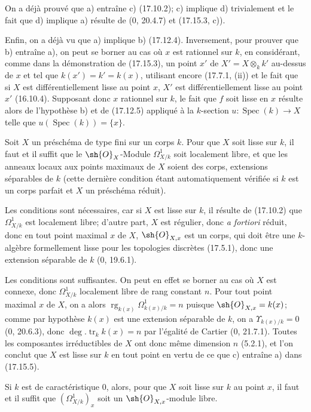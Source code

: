 On a déjà prouvé que a) entraîne c) (17.10.2); c) implique d) trivialement et le fait que d) implique a) résulte de (0, 20.4.7) et (17.15.3, c)).

Enfin, on a déjà vu que a) implique b) (17.12.4). Inversement, pour prouver que b) entraîne a), on peut se borner au cas où $x$ est rationnel sur $k$, en considérant, comme dans la démonstration de (17.15.3), un point $x'$ de $X'=X\otimes_k k'$ au-dessus de $x$ et tel que $k(x')=k'=k(x)$, utilisant encore (17.7.1, (ii)) et le fait que si $X$ est différentiellement lisse au point $x$, $X'$ est différentiellement lisse au point $x'$ (16.10.4). Supposant donc $x$ rationnel sur $k$, le fait que $f$ soit lisse en $x$ résulte alors de l'hypothèse b) et de (17.12.5) appliqué à la $k$-section $u:\operatorname{Spec}(k)\to X$ telle que $u(\operatorname{Spec}(k))=\{x\}$.

\begin{corollary}[17.15.6]
\label{IV.17.15.6}
Soit $X$ un préschéma de type fini sur un corps $k$. Pour que $X$ soit lisse sur $k$, il faut et il suffit que le $\sh{O}_X$-Module $\Omega^1_{X/k}$ soit localement libre, et que les anneaux locaux aux points maximaux de $X$ soient des corps, extensions séparables de $k$ (cette dernière condition étant automatiquement vérifiée si $k$ est un corps parfait et $X$ un préschéma réduit).
\end{corollary}

Les conditions sont nécessaires, car si $X$ est lisse sur $k$, il résulte de (17.10.2) que $\Omega^1_{X/k}$ est localement libre; d'autre part, $X$ est régulier, donc \emph{a fortiori} réduit, donc en tout point maximal $x$ de $X$, $\sh{O}_{X,x}$ est un corps, qui doit être une $k$-algèbre formellement lisse pour les topologies discrètes (17.5.1), donc une extension séparable de $k$ (0, 19.6.1).

Les conditions sont suffisantes. On peut en effet se borner au cas où $X$ est connexe, donc $\Omega^1_{X/k}$ localement libre de rang constant $n$. Pour tout point maximal $x$ de $X$, on a alors $\operatorname{rg}_{k(x)}\Omega^1_{k(x)/k}=n$ puisque $\sh{O}_{X,x}=k(x)$; comme par hypothèse $k(x)$ est une extension séparable de $k$, on a $\Upsilon_{k(x)/k}=0$ (0, 20.6.3), donc $\deg.\operatorname{tr}_k k(x)=n$ par l'égalité de Cartier (0, 21.7.1). Toutes les composantes irréductibles de $X$ ont donc même dimension $n$ (5.2.1), et l'on conclut que $X$ est lisse sur $k$ en tout point en vertu de ce que c) entraîne a) dans (17.15.5).

\begin{corollary}[17.15.7]
\label{IV.17.15.7}
Si $k$ est de caractéristique 0, alors, pour que $X$ soit lisse sur $k$ au point $x$, il faut et il suffit que $(\Omega^1_{X/k})_x$ soit un $\sh{O}_{X,x}$-module libre.
\end{corollary}

